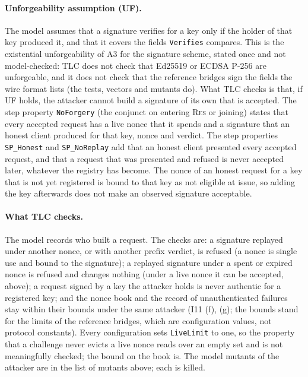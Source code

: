 \paragraph{Unforgeability assumption (UF).} The model assumes that a
signature verifies for a key only if the holder of that key produced it,
and that it covers the fields \texttt{Verifies} compares. This is the
existential unforgeability of A3 for the signature scheme, stated once and
not model-checked: TLC does not check that Ed25519 or ECDSA P-256 are
unforgeable, and it does not check that the reference bridges sign the
fields the wire format lists (the tests, vectors and mutants do). What TLC
checks is that, if UF holds, the attacker cannot build a signature of its
own that is accepted. The step property
\texttt{NoForgery} (the conjunct on entering \textsc{Res} or joining) states
that every accepted request has a live nonce that it spends and a signature
that an honest client produced for that key, nonce and verdict. The step
properties \texttt{SP\_Honest} and \texttt{SP\_NoReplay} add that an honest
client presented every accepted request, and that a request that was presented
and refused is never accepted later, whatever the registry has become. The
nonce of an honest request for a key that is not yet registered is bound to
that key as not eligible at issue, so adding the key afterwards does not make
an observed signature acceptable.

\paragraph{What TLC checks.} The model records who built a
request. The checks are: a signature replayed under another nonce, or
with another prefix verdict, is refused (a nonce is single use and bound to
the signature); a replayed signature under a spent or expired nonce is
refused and changes nothing (under a live nonce it can be accepted, above); a request signed by a key the attacker holds is
never authentic for a registered key; and the nonce book and the record of
unauthenticated failures stay within their bounds under the same attacker
(I11 (f), (g); the bounds stand for the limits of the reference bridges, which are
configuration values, not protocol constants). Every configuration sets
\texttt{LiveLimit} to one, so the property that a challenge never evicts a
live nonce reads over an empty set and is not meaningfully checked; the
bound on the book is. The model
mutants of the attacker are in the list of mutants above; each is killed.

